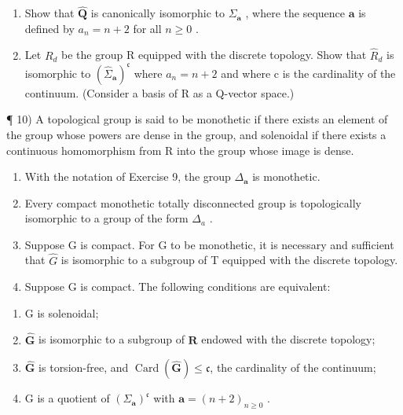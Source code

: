 \begin{enumerate}
\def\labelenumi{\alph{enumi})}
\setcounter{enumi}{4}
\item
  Show that \(\widehat{\mathbf{Q}}\) is canonically isomorphic to \(\Sigma_{\pmb{a}}\) , where the sequence \(\pmb{a}\) is defined by \(a_{n} = n + 2\) for all \(n \geqslant 0\) .
\item
  Let \(R_{d}\) be the group R equipped with the discrete topology. Show that \(\widehat{R}_{d}\) is isomorphic to \((\widehat{\Sigma}_{\boldsymbol{a}})^{\mathfrak{c}}\) where \(a_{n}=n+2\) and where c is the cardinality of the continuum. (Consider a basis of R as a Q-vector space.)
\end{enumerate}

¶ 10) A topological group is said to be monothetic if there exists an element of the group whose powers are dense in the group, and solenoidal if there exists a continuous homomorphism from R into the group whose image is dense.

\begin{enumerate}
\def\labelenumi{\alph{enumi})}
\item
  With the notation of Exercise 9, the group \(\Delta_{\pmb{a}}\) is monothetic.
\item
  Every compact monothetic totally disconnected group is topologically isomorphic to a group of the form \(\Delta_{a}\) .
\item
  Suppose G is compact. For G to be monothetic, it is necessary and sufficient that \(\widehat{G}\) is isomorphic to a subgroup of T equipped with the discrete topology.
\item
  Suppose G is compact. The following conditions are equivalent:
\end{enumerate}

\begin{enumerate}
\def\labelenumi{(\roman{enumi})}
\item
  G is solenoidal;
\item
  \(\widehat{\mathbf{G}}\) is isomorphic to a subgroup of \(\mathbf{R}\) endowed with the discrete topology;
\item
  \(\widehat{\mathbf{G}}\) is torsion-free, and \(\operatorname{Card}(\widehat{\mathbf{G}}) \leqslant \mathfrak{c}\), the cardinality of the continuum;
\item
  G is a quotient of \((\Sigma_{\boldsymbol{a}})^{\mathfrak{c}}\) with \(\boldsymbol{a}=(n+2)_{n\geqslant0}\) .
\end{enumerate}

